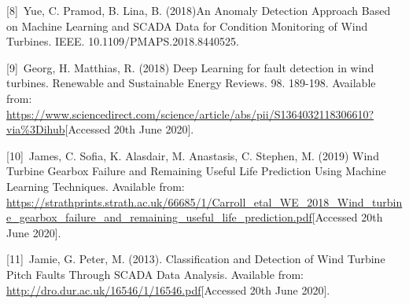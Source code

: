 \documentclass[english,a4paper,11pt]{article}
\begin{document}
[8]\ Yue, C. Pramod, B. Lina, B. (2018)An Anomaly Detection Approach Based on Machine Learning and SCADA Data for Condition Monitoring of Wind Turbines. IEEE. 10.1109/PMAPS.2018.8440525.

[9]\ Georg, H. Matthias, R. (2018) Deep Learning for fault detection in wind turbines. Renewable and Sustainable Energy Reviews. 98. 189-198. Available from: \url{https://www.sciencedirect.com/science/article/abs/pii/S1364032118306610?via\%3Dihub}[Accessed 20th June 2020].

[10]\ James, C. Sofia, K. Alasdair, M. Anastasis, C. Stephen, M. (2019) Wind Turbine Gearbox Failure and Remaining Useful Life Prediction Using Machine Learning Techniques. Available from: \url{https://strathprints.strath.ac.uk/66685/1/Carroll_etal_WE_2018_Wind_turbine_gearbox_failure_and_remaining_useful_life_prediction.pdf}[Accessed 20th June 2020].


[11]\ Jamie, G. Peter, M. (2013). Classification and Detection of Wind Turbine Pitch Faults Through SCADA Data Analysis. Available from: \url{http://dro.dur.ac.uk/16546/1/16546.pdf}[Accessed 20th June 2020].
\end{document}
